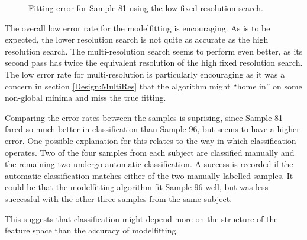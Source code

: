 \begin{figure}[p]
        \quad

        \caption{Fitting error for Sample 81 using the low fixed resolution search.}
        \label{ManualFit81:res10}
\end{figure}


The overall low error rate for the modelfitting is encouraging.
As is to be expected, the lower resolution search is not quite as accurate as the high resolution search.
The multi-resolution search seems to perform even better, as its second pass has twice the equivalent resolution of the high fixed resolution search.
The low error rate for multi-resolution is particularly encouraging as it was a concern in section \ref{Design:MultiRes} that the algorithm might ``home in'' on some non-global minima and miss the true fitting.

Comparing the error rates between the samples is suprising, since Sample 81 fared so much better in classification than Sample 96, but seems to have a higher error.
One possible explanation for this relates to the way in which classification operates.
Two of the four samples from each subject are classified manually and the remaining two undergo automatic classification.
A success is recorded if the automatic classification matches either of the two manually labelled samples.
It could be that the modelfitting algorithm fit Sample 96 well, but was less successful with the other three samples from the same subject.

This suggests that classification might depend more on the structure of the feature space than the accuracy of modelfitting.

